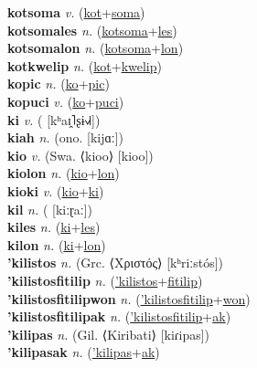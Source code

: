 \textbf{kotsoma} \textit{v.} (\hyperref[kot]{kot}+\hyperref[soma]{soma})
 \label{kotsoma} \\
\textbf{kotsomales} \textit{n.} (\hyperref[kotsoma]{kotsoma}+\hyperref[les]{les})
 \label{kotsomales} \\
\textbf{kotsomalon} \textit{n.} (\hyperref[kotsoma]{kotsoma}+\hyperref[lon]{lon})
 \label{kotsomalon} \\
\textbf{kotkwelip} \textit{n.} (\hyperref[kot]{kot}+\hyperref[kwelip]{kwelip})
 \label{kotkwelip} \\
\textbf{kopic} \textit{n.} (\hyperref[ko]{ko}+\hyperref[pic]{pic})
 \label{kopic} \\
\textbf{kopuci} \textit{v.} (\hyperref[ko]{ko}+\hyperref[puci]{puci})
 \label{kopuci} \\
\textbf{ki} \textit{v.} ( [kʰaɪ̯˥ʂɨ˧˩˧])
 \label{ki} \\
\textbf{kiah} \textit{n.} (ono. [kijɑː])
 \label{kiah} \\
\textbf{kio} \textit{v.} (Swa. ⟨kioo⟩ [kioo])
 \label{kio} \\
\textbf{kiolon} \textit{n.} (\hyperref[kio]{kio}+\hyperref[lon]{lon})
 \label{kiolon} \\
\textbf{kioki} \textit{v.} (\hyperref[kio]{kio}+\hyperref[ki]{ki})
 \label{kioki} \\
\textbf{kil} \textit{n.} ( [kiːɽaː])
 \label{kil} \\
\textbf{kiles} \textit{n.} (\hyperref[ki]{ki}+\hyperref[les]{les})
 \label{kiles} \\
\textbf{kilon} \textit{n.} (\hyperref[ki]{ki}+\hyperref[lon]{lon})
 \label{kilon} \\
\textbf{'kilistos} \textit{n.} (Grc. ⟨Χριστός⟩ [kʰriːstós])
 \label{'kilistos} \\
\textbf{'kilistosfitilip} \textit{n.} (\hyperref['kilistos]{'kilistos}+\hyperref[fitilip]{fitilip})
 \label{'kilistosfitilip} \\
\textbf{'kilistosfitilipwon} \textit{n.} (\hyperref['kilistosfitilip]{'kilistosfitilip}+\hyperref[won]{won})
 \label{'kilistosfitilipwon} \\
\textbf{'kilistosfitilipak} \textit{n.} (\hyperref['kilistosfitilip]{'kilistosfitilip}+\hyperref[ak]{ak})
 \label{'kilistosfitilipak} \\
\textbf{'kilipas} \textit{n.} (Gil. ⟨Kiribati⟩ [kiɾipas])
 \label{'kilipas} \\
\textbf{'kilipasak} \textit{n.} (\hyperref['kilipas]{'kilipas}+\hyperref[ak]{ak})
 \label{'kilipasak} \\
